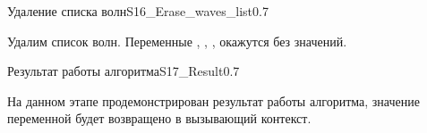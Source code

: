 \begin{itemize}
\begin{algostep}{Удаление списка волн}{S16_Erase_waves_list}{0.7}
 
  Удалим список волн. Переменные ,
  , ,
   окажутся без значений.
\end{algostep}


\begin{algostep}{Результат работы алгоритма}{S17_Result}{0.7}
 
  На данном этапе продемонстрирован результат работы алгоритма,
  значение переменной  будет возвращено в вызывающий
  контекст.
\end{algostep}
\end{itemize}

